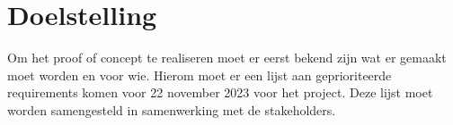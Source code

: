 \section{Doelstelling}
Om het proof of concept te realiseren moet er eerst bekend zijn wat er gemaakt moet worden en voor wie.
Hierom moet er een lijst aan geprioriteerde requirements komen voor 22 november 2023 voor het  project.
Deze lijst moet worden samengesteld in samenwerking met de stakeholders.

